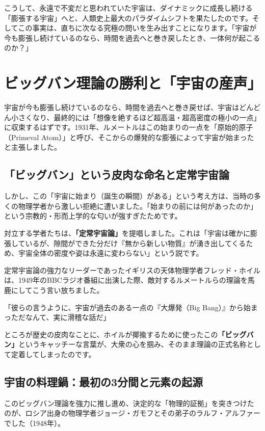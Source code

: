 こうして、永遠で不変だと思われていた宇宙は、ダイナミックに成長し続ける「膨張する宇宙」へと、人類史上最大のパラダイムシフトを果たしたのです。そしてこの事実は、直ちに次なる究極の問いを生み出すことになります。「宇宙が今も膨張し続けているのなら、時間を過去へと巻き戻したとき、一体何が起こるのか？」

\section{ビッグバン理論の勝利と「宇宙の産声」}

宇宙が今も膨張し続けているのなら、時間を過去へと巻き戻せば、宇宙はどんどん小さくなり、最終的には「想像を絶するほど超高温・超高密度の極小の一点」に収束するはずです。1931年、ルメートルはこの始まりの一点を「原始的原子（Primeval Atom）」と呼び、そこからの爆発的な膨張によって宇宙が始まったと主張しました。

\subsection{「ビッグバン」という皮肉な命名と定常宇宙論}

しかし、この「宇宙に始まり（誕生の瞬間）がある」という考え方は、当時の多くの物理学者から激しい拒絶に遭いました。「始まりの前には何があったのか」という宗教的・形而上学的な匂いが強すぎたためです。

対立する学者たちは、\textbf{「定常宇宙論」}を提唱しました。これは「宇宙は確かに膨張しているが、隙間ができた分だけ『無から新しい物質』が湧き出してくるため、宇宙全体の密度や姿は永遠に変わらない」という説です。

定常宇宙論の強力なリーダーであったイギリスの天体物理学者フレッド・ホイルは、1949年のBBCラジオ番組に出演した際、敵対するルメートルらの理論を馬鹿にしてこう言い放ちました。

「彼らの言うように、宇宙が過去のある一点の『大爆発（Big Bang）』から始まっただなんて、実に滑稽な話だ」

ところが歴史の皮肉なことに、ホイルが揶揄するために使ったこの\textbf{「ビッグバン」}というキャッチーな言葉が、大衆の心を掴み、そのまま理論の正式名称として定着してしまったのです。

\subsection{宇宙の料理鍋：最初の3分間と元素の起源}

このビッグバン理論を強力に推し進め、決定的な「物理的証拠」を突きつけたのが、ロシア出身の物理学者ジョージ・ガモフとその弟子のラルフ・アルファーでした（1948年）。

